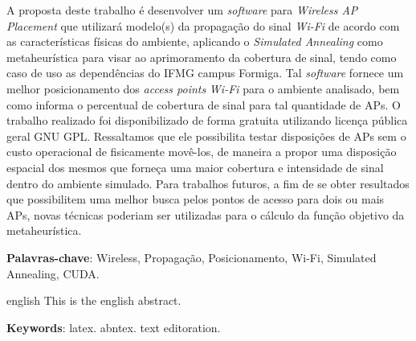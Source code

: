 \documentclass[
	12pt,				%
	openright,			%
	twoside,			%
	a4paper,			%
	english,			%
	french,				%
	spanish,			%
	brazil				%
	]{abntex2}
\begin{document}
\setlength{\absparsep}{18pt} %
\begin{resumo}
A proposta deste trabalho é desenvolver um \textit{software} para \textit{Wireless AP Placement}  que utilizará modelo(s) da propagação do sinal \textit{Wi-Fi} de acordo com as características físicas do ambiente, aplicando o \textit{Simulated Annealing} como metaheurística para visar ao aprimoramento da cobertura de sinal, tendo como caso de uso as dependências do IFMG campus Formiga. Tal \textit{software} fornece um melhor posicionamento dos \textit{access points} \textit{Wi-Fi} para o ambiente analisado, bem como informa o percentual de cobertura de sinal para tal quantidade de APs. O trabalho realizado foi disponibilizado de forma gratuita utilizando licença pública geral GNU GPL. Ressaltamos que ele possibilita testar disposições de APs sem o custo operacional de fisicamente movê-los, de maneira a propor uma disposição espacial dos mesmos que forneça uma maior cobertura e intensidade de sinal dentro do ambiente simulado. Para trabalhos futuros, a fim de se obter resultados que possibilitem uma melhor busca pelos pontos de acesso para dois ou mais APs, novas técnicas poderiam ser utilizadas para o cálculo da função objetivo da metaheurística. 

 \textbf{Palavras-chave}:  Wireless, Propagação, Posicionamento, Wi-Fi, Simulated Annealing, CUDA.
\end{resumo}

\begin{resumo}[Abstract]
 \begin{otherlanguage*}{english}
   This is the english abstract.

   \vspace{\onelineskip}
 
   \noindent 
   \textbf{Keywords}: latex. abntex. text editoration.
 \end{otherlanguage*}
\end{resumo}

% 

%  
\end{document}
